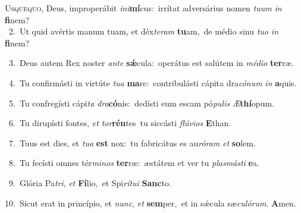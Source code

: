 \lettrine{\initial\textcolor{\initialcolor}{U}}{squequo,} Deus, improperábit \textit{in}\-\textit{i}\textbf{mí}cus:~\star irrítat adversárius nomen \textit{tu}\-\textit{um} \textit{in} \textbf{fi}\-nem?\\
{\numbfont\textcolor{\numbcolor}{~2.}}~Ut quid avértis manum tuam, et déx\-\textit{te}\-\textit{ram} \textbf{tu}\-am,~\star de médio sinu \textit{tu}\-\textit{o} \textit{in} \textbf{fi}\-nem?\par
{\numbfont\textcolor{\numbcolor}{~3.}}~Deus autem Rex noster \textit{an}\-\textit{te} \textbf{sǽ}\-cula:~\star operátus est salútem in \textit{mé}\-\textit{di}\textit{o} \textbf{ter}\-ræ.\par
{\numbfont\textcolor{\numbcolor}{~4.}}~Tu confirmásti in virtúte \textit{tu}\-\textit{a} \textbf{ma}\-re:~\star contribulásti cápita dra\-\textit{có}\-\textit{num} \textit{in} \textbf{a}\-quis.\par
{\numbfont\textcolor{\numbcolor}{~5.}}~Tu confregísti cápi\textit{ta} \textit{dra}\-\textbf{có}nis:~\star dedísti eum escam pó\-\textit{pu}\-\textit{lis} \textit{Æ}\-\textbf{thí}opum.\par
{\numbfont\textcolor{\numbcolor}{~6.}}~Tu dirupísti fontes, \textit{et} \textit{tor}\-\textbf{rén}tes~\star tu siccásti \textit{flú}\-\textit{vi}\textit{os} \textbf{E}\-than.\par
{\numbfont\textcolor{\numbcolor}{~7.}}~Tuus est dies, et \textit{tu}\-\textit{a} \textbf{est} nox:~\star tu fabricátus es au\-\textit{ró}\-\textit{ram} \textit{et} \textbf{so}\-lem.\par
{\numbfont\textcolor{\numbcolor}{~8.}}~Tu fecísti omnes tér\-\textit{mi}\-\textit{nos} \textbf{ter}\-ræ:~\star æstátem et ver tu \textit{plas}\-\textit{más}\textit{ti} \textbf{e}\-a.\par
{\numbfont\textcolor{\numbcolor}{~9.}}~Glória Pa\-\textit{tri}\-, \textit{et} \textbf{Fí}\-lio,~\star et Spi\-\textit{rí}\-\textit{tu}\textit{i} \textbf{Sanc}\-to.\par
{\numbfont\textcolor{\numbcolor}{10.}}~Sicut erat in princípio, et \textit{nunc}\-, \textit{et} \textbf{sem}\-per,~\star et in sǽcula sæ\-\textit{cu}\-\textit{ló}\textit{rum}. \textbf{A}\-men.\par
